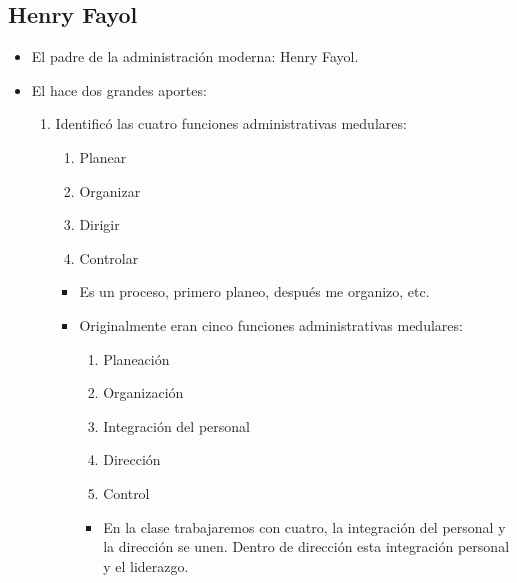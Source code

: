 \subsection{Henry Fayol}
\begin{itemize}
    \item El padre de la administración moderna: Henry Fayol.
    \item El hace dos grandes aportes:
        \begin{enumerate}
            \item  Identificó las cuatro funciones administrativas medulares:
                \begin{enumerate}
                    \item Planear
                    \item Organizar
                    \item Dirigir 
                    \item Controlar 
                \end{enumerate}
                \begin{itemize}[label=\#]
                    \item Es un proceso, primero planeo, después me organizo, etc.
                    \item Originalmente eran cinco funciones administrativas medulares:
                        \begin{enumerate}
                            \item Planeación 
                            \item Organización 
                            \item Integración del personal 
                            \item Dirección 
                            \item Control 
                        \end{enumerate}
                        \begin{itemize}[label=\#]
                            \item En la clase trabajaremos con cuatro, la integración del personal y la dirección se unen. Dentro de dirección esta integración personal y el liderazgo.
                        \end{itemize}
                \end{itemize}
            

\end{enumerate}
\end{itemize}
